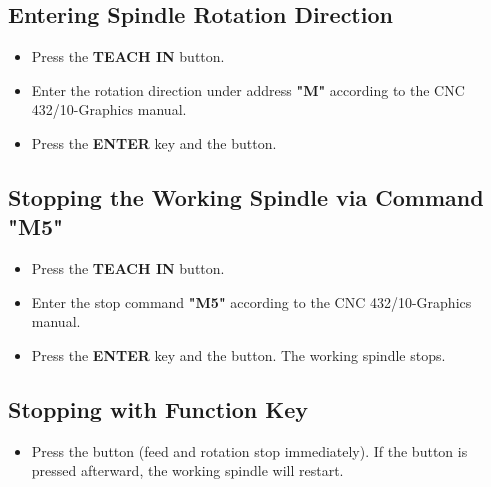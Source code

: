 
\subsection{Entering Spindle Rotation Direction}
\begin{itemize}
    \item Press the \textbf{TEACH IN} button.
    \item Enter the rotation direction under address \textbf{"M"} according to the CNC 432/10-Graphics manual.
    \item Press the \textbf{ENTER} key and the  button.
\end{itemize}


\subsection{Stopping the Working Spindle via Command \textbf{"M5"}}
\begin{itemize}
    \item Press the \textbf{TEACH IN} button.
    \item Enter the stop command \textbf{"M5"} according to the CNC 432/10-Graphics manual.
    \item Press the \textbf{ENTER} key and the  button. The working spindle stops.
\end{itemize}

\newpage

\subsection{Stopping with Function Key}

\begin{itemize}
    \item Press the  button (feed and rotation stop immediately). If the  button is pressed afterward, the working spindle will restart.
\end{itemize}

